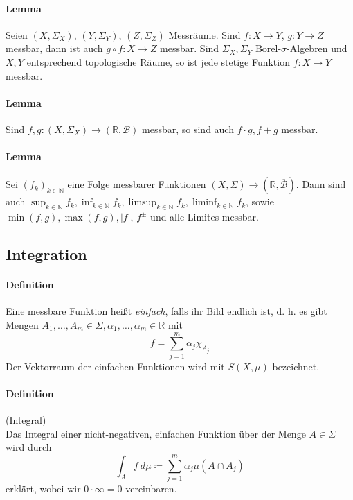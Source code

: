 \documentclass[12pt,a4paper,fleqn]{article}
\begin{document}
\paragraph{Lemma} Seien $(X, \Sigma_X)$, $(Y, \Sigma_Y)$, $(Z, \Sigma_Z)$ Messräume. Sind $f\colon X \rightarrow Y$, ${g: Y \rightarrow Z}$ messbar, dann ist auch $g \circ f\colon X \rightarrow Z$ messbar. Sind $\Sigma_X, \Sigma_Y$ Borel-$\sigma$-Algebren und $X, Y$ entsprechend topologische Räume, so ist jede stetige Funktion $f\colon X \rightarrow Y$ messbar.

\paragraph{Lemma} Sind $f, g: (X, \Sigma_X) \rightarrow (\mathbb{R}, \mathcal{B})$ messbar, so sind auch $f \cdot g, f+g$ messbar.

\paragraph{Lemma} Sei $(f_k)_{k \in \mathbb{N}}$ eine Folge messbarer Funktionen $(X, \Sigma) \rightarrow (\overline{\mathbb{R}}, \overline{\mathcal{B}})$. Dann sind auch $\sup_{k \in \mathbb{N}} f_k, \inf_{k \in \mathbb{N}} f_k, \limsup_{k \in \mathbb{N}} f_k, \liminf_{k \in \mathbb{N}} f_k$, sowie $\min(f, g), \max(f, g), \vert f \vert$, $f^\pm$ und alle Limites messbar.

\subsection{Integration}

\paragraph{Definition} Eine messbare Funktion heißt \textit{einfach}, falls ihr Bild endlich ist, d. h. es gibt Mengen $A_1, \dots, A_m \in \Sigma, \alpha_1, \dots, \alpha_m \in \mathbb{R}$ mit
\begin{displaymath}
f = \sum \limits _{j = 1}^m \alpha_j \chi_{A_j}
\end{displaymath}
Der Vektorraum der einfachen Funktionen wird mit $S(X, \mu)$ bezeichnet.

\paragraph{Definition} (Integral)\\
Das Integral einer nicht-negativen, einfachen Funktion über der Menge $A \in \Sigma$ wird durch
\begin{displaymath}
\int_A f\ d\mu \coloneqq \sum \limits _{j = 1}^m \alpha_j \mu(A \cap A_j)
\end{displaymath}
erklärt, wobei wir $0 \cdot \infty = 0$ vereinbaren.
\end{document}
